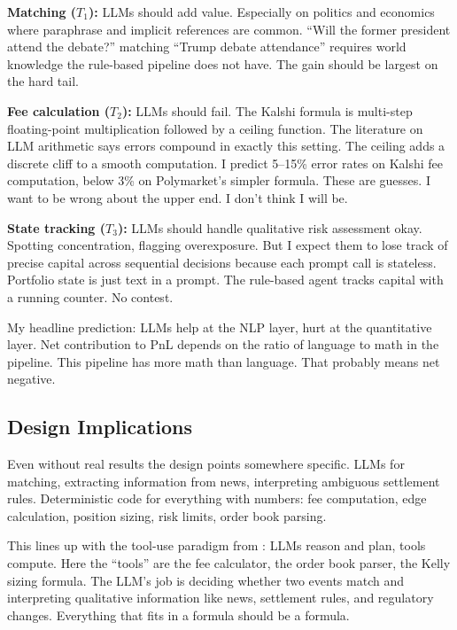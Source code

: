 \documentclass[11pt]{article}
\theoremstyle{definition}
\theoremstyle{remark}
\begin{document}
\textbf{Matching ($T_1$):} LLMs should add value. Especially on politics and economics where paraphrase and implicit references are common. ``Will the former president attend the debate?'' matching ``Trump debate attendance'' requires world knowledge the rule-based pipeline does not have. The gain should be largest on the hard tail.

\textbf{Fee calculation ($T_2$):} LLMs should fail. The Kalshi formula is multi-step floating-point multiplication followed by a ceiling function. The literature on LLM arithmetic \citep{dziri2023faith, qian2022limitations} says errors compound in exactly this setting. The ceiling adds a discrete cliff to a smooth computation. I predict 5--15\% error rates on Kalshi fee computation, below 3\% on Polymarket's simpler formula. These are guesses. I want to be wrong about the upper end. I don't think I will be.

\textbf{State tracking ($T_3$):} LLMs should handle qualitative risk assessment okay. Spotting concentration, flagging overexposure. But I expect them to lose track of precise capital across sequential decisions because each prompt call is stateless. Portfolio state is just text in a prompt. The rule-based agent tracks capital with a running counter. No contest.

My headline prediction: LLMs help at the NLP layer, hurt at the quantitative layer. Net contribution to PnL depends on the ratio of language to math in the pipeline. This pipeline has more math than language. That probably means net negative.

\subsection{Design Implications}
\label{sec:implications}

Even without real results the design points somewhere specific. LLMs for matching, extracting information from news, interpreting ambiguous settlement rules. Deterministic code for everything with numbers: fee computation, edge calculation, position sizing, risk limits, order book parsing.

This lines up with the tool-use paradigm from \citet{schick2023toolformer}: LLMs reason and plan, tools compute. Here the ``tools'' are the fee calculator, the order book parser, the Kelly sizing formula. The LLM's job is deciding whether two events match and interpreting qualitative information like news, settlement rules, and regulatory changes. Everything that fits in a formula should be a formula.
\end{document}
